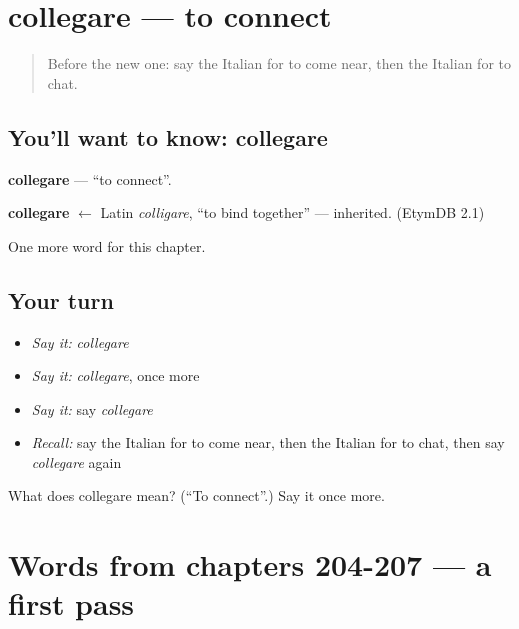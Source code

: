 \section[collegare]{collegare — to connect}

\label{lesson:IT-C212-collegare}



\begin{quote}
Before the new one: say the Italian for to come near, then the Italian for to chat.
\end{quote}

\subsection*{You'll want to know: collegare}
\textbf{collegare} — \textquotedblleft{}to connect\textquotedblright{}.

\begin{cousinweb}
\textbf{collegare} $\leftarrow$ Latin \emph{colligare}, \textquotedblleft{}to bind together\textquotedblright{} — inherited. (EtymDB 2.1)
\end{cousinweb}

\begin{grammarlens}[title={What you've built}]
One more word for this chapter.
\end{grammarlens}

\subsection*{Your turn}
\begin{itemize}
\raggedright
  \item \emph{Say it:} \emph{collegare}
  \item \emph{Say it:} \emph{collegare}, once more
  \item \emph{Say it:} say \emph{collegare}
  \item \emph{Recall:} say the Italian for to come near, then the Italian for to chat, then say \emph{collegare} again
\end{itemize}

\begin{tcolorbox}[breakable,colback=teal!4,colframe=teal!35!black,title={Before you move on}]
What does collegare mean? (\textquotedblleft{}To connect\textquotedblright{}.) Say it once more.
\end{tcolorbox}
\section[(dialogue)]{Words from chapters 204-207 — a first pass}

